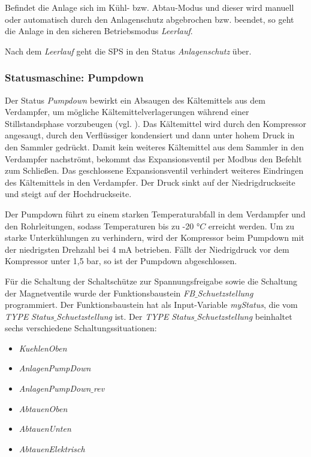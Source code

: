 Befindet die Anlage sich im Kühl- bzw. Abtau-Modus und dieser wird manuell oder automatisch durch den Anlagenschutz abgebrochen bzw. beendet, so geht die Anlage in den sicheren Betriebsmodus \textit{Leerlauf}.  

Nach dem \textit{Leerlauf} geht die SPS in den Status \textit{Anlagenschutz} über.  

\subsubsection*{Statusmaschine: Pumpdown}

Der Status \textit{Pumpdown} bewirkt ein Absaugen des Kältemittels aus dem Verdampfer, um mögliche Kältemittelverlagerungen während einer Stillstandsphase vorzubeugen (vgl. \citep{Siemens2007a}).  Das Kältemittel wird durch den Kompressor angesaugt, durch den Verflüssiger kondensiert und dann unter hohem Druck in den Sammler gedrückt. Damit kein weiteres Kältemittel aus dem Sammler in den Verdampfer nachströmt, bekommt das Expansionsventil per Modbus den Befehlt zum Schließen. Das geschlossene Expansionsventil verhindert weiteres Eindringen des Kältemittels in den Verdampfer. Der Druck sinkt auf der Niedrigdruckseite und steigt auf der Hochdruckseite. 

Der Pumpdown führt zu einem starken Temperaturabfall in dem Verdampfer und den Rohrleitungen, sodass Temperaturen bis zu -20 $°C$ erreicht werden. Um zu starke Unterkühlungen zu verhindern, wird der Kompressor beim Pumpdown mit der niedrigsten Drehzahl bei 4 mA betrieben. Fällt der Niedrigdruck vor dem Kompressor unter 1,5  bar, so ist der Pumpdown abgeschlossen.

Für die Schaltung der Schaltschütze zur Spannungsfreigabe sowie die Schaltung der Magnetventile wurde der Funktionsbaustein \textit{FB$\_$Schuetzstellung} programmiert. Der Funktionsbaustein hat als Input-Variable \textit{myStatus}, die vom \textit{TYPE}  \textit{Status$\_$Schuetzstellung} ist. Der \textit{TYPE}  \textit{Status$\_$Schuetzstellung} beinhaltet sechs verschiedene Schaltungssituationen:

\begin{itemize}
\item	\textit{KuehlenOben}
\item	\textit{AnlagenPumpDown}
\item	\textit{AnlagenPumpDown$\_$rev}
\item	\textit{AbtauenOben}
\item	\textit{AbtauenUnten}
\item	\textit{AbtauenElektrisch}
\end{itemize}

